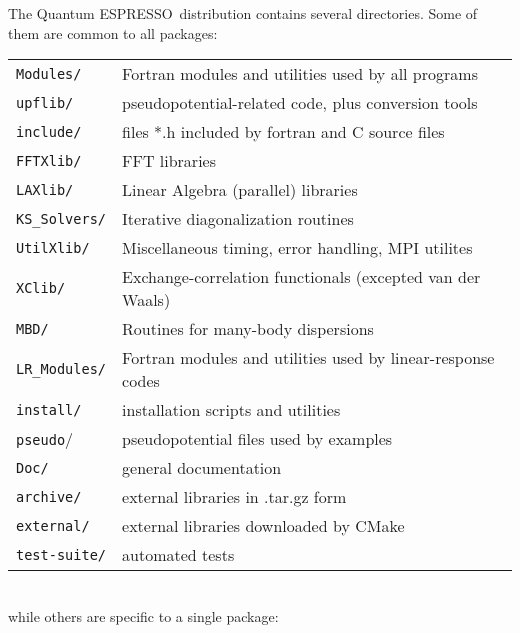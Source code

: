 \documentclass[12pt,a4paper]{article}
\def\qe{{\sc Quantum ESPRESSO}}
\begin{document}

The \qe\ distribution contains several directories. Some of them are
common to all packages:

\begin{tabular}{ll}
\texttt{Modules/}    & Fortran modules and utilities used by all programs\\
\texttt{upflib/}     & pseudopotential-related code, plus conversion tools\\
\texttt{include/}    & files *.h included by fortran and C source files\\
\texttt{FFTXlib/}    & FFT libraries\\
\texttt{LAXlib/}     & Linear Algebra (parallel) libraries\\
\texttt{KS\_Solvers/}& Iterative diagonalization routines\\
\texttt{UtilXlib/}   & Miscellaneous timing, error handling, MPI utilites\\
\texttt{XClib/}      & Exchange-correlation functionals (excepted van der Waals)\\
\texttt{MBD/}        & Routines for many-body dispersions\\
\texttt{LR\_Modules/}& Fortran modules and utilities used by linear-response codes\\
\texttt{install/}    & installation scripts and utilities\\
\texttt{pseudo}/     & pseudopotential files used by examples\\
\texttt{Doc/}        & general documentation\\
\texttt{archive/}    & external libraries in .tar.gz form\\
\texttt{external/}   & external libraries downloaded by CMake\\
\texttt{test-suite/} & automated tests
\end{tabular}
\\
while others are specific to a single package:
\end{document}
